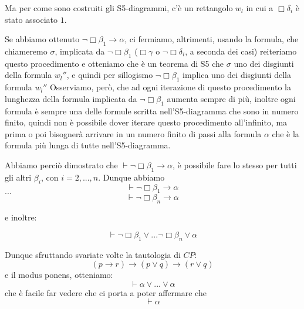 \documentclass[a4paper, titlepage, 12pt]{report}
\begin{document}
Ma per come sono costruiti gli S5-diagrammi, c'è un rettangolo $w_l$ in cui a $\Box \delta_i$
è stato associato $1$.

Se abbiamo ottenuto $\neg \Box \beta_1 \rightarrow \alpha$, ci fermiamo,
altrimenti, usando la formula, che chiameremo $\sigma$, implicata da $\neg \Box \beta_1$
($\Box \gamma$ o $\neg \Box \delta_i$, a seconda dei casi) reiteriamo questo procedimento
e otteniamo che è un teorema di S5 che $\sigma$ uno dei disgiunti della formula $w_l''$, e quindi
per sillogismo $\neg \Box \beta_1$ implica uno dei disgiunti della formula $w_l''$
Osserviamo, però, che ad ogni iterazione di questo procedimento la lunghezza
della formula implicata da $\neg \Box \beta_1$ aumenta sempre di più, inoltre ogni formula
è sempre una delle formule scritta nell'S5-diagramma che sono in numero finito,
quindi non è possibile dover iterare questo procedimento all'infinito, ma prima o poi
bisognerà arrivare in un numero finito di passi alla formula $\alpha$ che è la formula
più lunga di tutte nell'S5-diagramma.

Abbiamo perciò dimostrato che $\vdash \neg \Box \beta_1 \rightarrow \alpha$,
è possibile fare lo stesso per tutti gli altri $\beta_i$, con $i = 2, ..., n$.
Dunque abbiamo
$$\vdash \neg \Box \beta_1 \rightarrow \alpha$$
$...$
$$\vdash \neg \Box \beta_n \rightarrow \alpha$$

e inoltre:

$$\vdash \neg \Box \beta_1 \lor ... \neg \Box \beta_n \lor \alpha$$

Dunque sfruttando svariate volte la tautologia di $CP$:
$$(p \rightarrow r) \rightarrow (p \lor q) \rightarrow (r \lor q)$$
e il modus ponens, otteniamo:
$$\vdash \alpha \lor ... \lor \alpha$$
che è facile far vedere che ci porta a poter affermare che
$$\vdash \alpha$$
\end{document}
